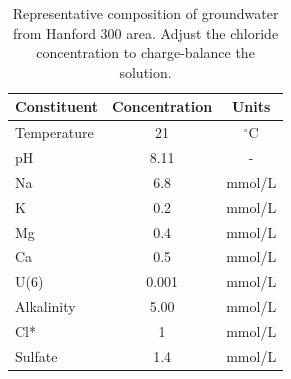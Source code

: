 \begin{table}
\caption{Representative composition of groundwater from Hanford 300 area. Adjust the chloride concentration to charge-balance the solution.}
\begin{center}
\begin{tabular}{l c c }
\hline
Constituent	& Concentration	& Units     \\ \hline
Temperature	& 21	          & $^\circ$C \\
pH	        &     8.11	    &  -        \\
Na	        & 6.8	          & mmol/L    \\
K	          & 0.2	          & mmol/L    \\
Mg	        & 0.4	          & mmol/L    \\
Ca	        & 0.5	          & mmol/L    \\
U(6)	      & 0.001	        & mmol/L    \\
Alkalinity	& 5.00	        & mmol/L    \\
Cl*	        & 1             & mmol/L    \\	
Sulfate	    & 1.4	          & mmol/L    \\ \hline
\end{tabular}
\label{tab:stoliker}
\end{center}
\end{table}
